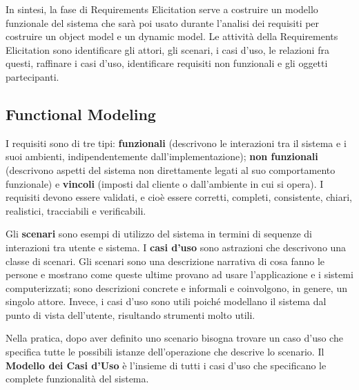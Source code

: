 \documentclass{article}
\begin{document}
        \vspace{3mm}
        
        In sintesi, la fase di Requirements Elicitation serve a costruire un modello funzionale del sistema che sarà poi usato durante l’analisi dei requisiti per costruire un object model e un dynamic model. Le attività della Requirements Elicitation sono identificare gli attori, gli scenari, i casi d’uso, le relazioni fra questi, raffinare i casi d’uso, identificare requisiti non funzionali e gli oggetti partecipanti.

    \subsection{Functional Modeling}
        
        I requisiti sono di tre tipi: \textbf{funzionali} (descrivono le interazioni tra il sistema e i suoi ambienti, indipendentemente dall’implementazione); \textbf{non funzionali} (descrivono aspetti del sistema non direttamente legati al suo comportamento funzionale) e \textbf{vincoli} (imposti dal cliente o dall’ambiente in cui si opera). I requisiti devono essere validati, e cioè essere corretti, completi, consistente, chiari, realistici, tracciabili e verificabili.
        
        \vspace{3mm}
        
        Gli \textbf{scenari} sono esempi di utilizzo del sistema in termini di sequenze di interazioni tra utente e sistema. I \textbf{casi d’uso} sono astrazioni che descrivono una classe di scenari.  Gli scenari sono una descrizione narrativa di cosa fanno le persone e mostrano come queste ultime provano ad usare l’applicazione e i sistemi computerizzati; sono descrizioni concrete e informali e coinvolgono, in genere, un singolo attore. Invece, i casi d’uso sono utili poiché modellano il sistema dal punto di vista dell’utente, risultando strumenti molto utili. 
        
        \vspace{3mm}
        
        Nella pratica, dopo aver definito uno scenario bisogna trovare un caso d’uso che specifica tutte le possibili istanze dell’operazione che descrive lo scenario. Il \textbf{Modello dei Casi d’Uso} è l’insieme di tutti i casi d’uso che specificano le complete funzionalità del sistema. 
        
        \vspace{3mm}
        
\end{document}
